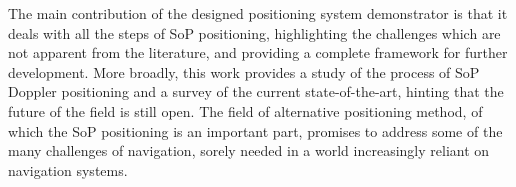 The main contribution of the designed positioning system demonstrator is that it deals with all the steps of SoP positioning, highlighting the challenges which are not apparent from the literature, and providing a complete framework for further development. More broadly, this work provides a study of the process of SoP Doppler positioning and a survey of the current state-of-the-art, hinting that the future of the field is still open. The field of alternative positioning method, of which the SoP positioning is an important part, promises to address some of the many challenges of navigation, sorely needed in a world increasingly reliant on navigation systems.

